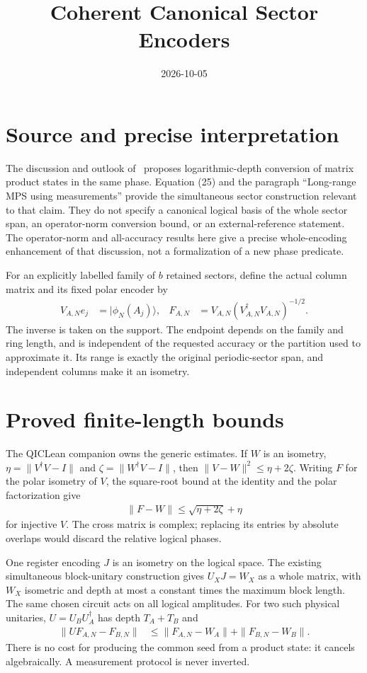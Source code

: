 \documentclass{article}
\title{Coherent Canonical Sector Encoders}
\author{}
\date{2026-10-05}
\begin{document}
\maketitle
{}

\section{Source and precise interpretation}
The discussion and outlook of~\cite{Malz2024Preparation} proposes
logarithmic-depth conversion of matrix product states in the same phase.
Equation (25) and the paragraph ``Long-range MPS using measurements''
provide the simultaneous sector construction relevant to that claim.
They do not specify a canonical logical basis of the whole sector span,
an operator-norm conversion bound, or an external-reference statement.
The operator-norm and all-accuracy results here give a precise whole-encoding
enhancement of that discussion, not a formalization of a new phase predicate.

For an explicitly labelled family of $b$ retained sectors, define the actual
column matrix and its fixed polar encoder by
\begin{align}
    V_{A,N}e_j & =|\phi_N(A_j)\rangle,                     &
    F_{A,N}    & =V_{A,N}(V_{A,N}^\dagger V_{A,N})^{-1/2}.
\end{align}
The inverse is taken on the support. The endpoint depends on the family and
ring length, and is independent of the requested accuracy or the partition
used to approximate it. Its range is exactly the original periodic-sector
span, and independent columns make it an isometry.

\section{Proved finite-length bounds}
The QICLean companion owns the generic estimates. If $W$ is an isometry,
$\eta=\|V^\dagger V-I\|$ and $\zeta=\|W^\dagger V-I\|$, then
$\|V-W\|^2\le\eta+2\zeta$. Writing $F$ for the polar isometry of $V$, the square-root bound at the
identity and the polar factorization give
\begin{align}
    \|F-W\|\le\sqrt{\eta+2\zeta}+\eta
\end{align}
for injective $V$. The cross matrix is complex; replacing its entries by
absolute overlaps would discard the relative logical phases.

One register encoding $J$ is an isometry on the logical space. The existing
simultaneous block-unitary construction gives $U_XJ=W_X$ as a whole matrix,
with $W_X$ isometric and depth at most a constant times the maximum block
length. The same chosen circuit acts on all logical amplitudes. For two
such physical unitaries, $U=U_BU_A^\dagger$ has depth $T_A+T_B$ and
\begin{align}
    \|UF_{A,N}-F_{B,N}\|
     & \le\|F_{A,N}-W_A\|+\|F_{B,N}-W_B\|.
\end{align}
There is no cost for producing the common seed from a product state: it
cancels algebraically. A measurement protocol is never inverted.
\end{document}
